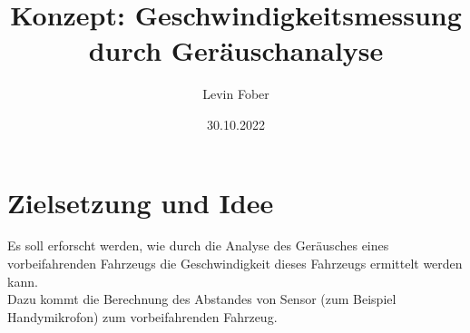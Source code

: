 \documentclass[12pt]{article}
\title{Konzept: Geschwindigkeitsmessung durch Geräuschanalyse}
\author{Levin Fober}
\date{30.10.2022}
\begin{document}
\maketitle

\section{Zielsetzung und Idee}
Es soll erforscht werden, wie durch die Analyse des Geräusches eines
vorbeifahrenden Fahrzeugs die Geschwindigkeit dieses Fahrzeugs ermittelt werden
kann. \\
Dazu kommt die Berechnung des Abstandes von Sensor (zum Beispiel Handymikrofon)
zum vorbeifahrenden Fahrzeug.
\end{document}
